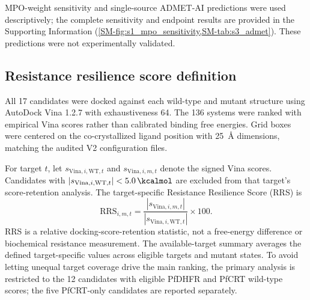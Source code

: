 \documentclass[journal=jcisd8,manuscript=article,layout=traditional]{achemso}
\begin{document}
MPO-weight sensitivity and single-source ADMET-AI predictions were used descriptively; the complete sensitivity and endpoint results are provided in the Supporting Information (\cref{SM-fig:s1_mpo_sensitivity,SM-tab:s3_admet}). These predictions were not experimentally validated.

\subsection{Resistance resilience score definition}\label{sec:rrs_formula}

All 17 candidates were docked against each wild-type and mutant structure using AutoDock Vina 1.2.7 with exhaustiveness \num{64}. The 136 systems were ranked with empirical Vina scores rather than calibrated binding free energies. Grid boxes were centered on the co-crystallized ligand position with \qty{25}{\angstrom} dimensions, matching the audited V2 configuration files.

For target $t$, let $s_{\mathrm{Vina},i,\mathrm{WT},t}$ and $s_{\mathrm{Vina},i,m,t}$ denote the signed Vina scores. Candidates with $|s_{\mathrm{Vina},i,\mathrm{WT},t}| < \qty{5.0}{\kcalmol}$ are excluded from that target's score-retention analysis. The target-specific Resistance Resilience Score (RRS) is
\begin{equation}
\mathrm{RRS}_{i,m,t} = \frac{|s_{\mathrm{Vina},i,m,t}|}{|s_{\mathrm{Vina},i,\mathrm{WT},t}|} \times 100.
\end{equation}
RRS is a relative docking-score-retention statistic, not a free-energy difference or biochemical resistance measurement. The available-target summary averages the defined target-specific values across eligible targets and mutant states. To avoid letting unequal target coverage drive the main ranking, the primary analysis is restricted to the 12 candidates with eligible PfDHFR and PfCRT wild-type scores; the five PfCRT-only candidates are reported separately.
\end{document}
